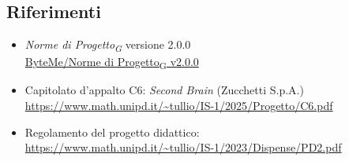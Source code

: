 \documentclass[11pt,a4paper]{article}
\newcommand{\gls}[1]{#1\textsubscript{G}}
\begin{document}
\subsection{Riferimenti}
\begin{itemize}
  \item \textit{\gls{Norme di Progetto}} versione 2.0.0\\
  \href{https://byteme25.github.io/ByteMe/files.html}{ByteMe/\gls{Norme di Progetto} v2.0.0}
  \item Capitolato d'appalto C6: \textit{Second Brain} (Zucchetti S.p.A.)\\ \url{https://www.math.unipd.it/~tullio/IS-1/2025/Progetto/C6.pdf}
  \item Regolamento del progetto didattico:\\
        \url{https://www.math.unipd.it/~tullio/IS-1/2023/Dispense/PD2.pdf}
\end{itemize}
 
\end{document}
